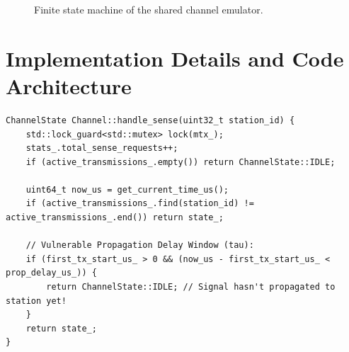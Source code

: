 \documentclass[11pt,a4paper]{article}
\begin{document}
\begin{figure}[H]
\centering
{}
\caption{Finite state machine of the shared channel emulator.}
\label{fig:fsm_diagram}
\end{figure}

\section{Implementation Details and Code Architecture}

\begin{lstlisting}[caption={Propagation modeling and collision arbitration in \texttt{src/channel.cpp}.}]
ChannelState Channel::handle_sense(uint32_t station_id) {
    std::lock_guard<std::mutex> lock(mtx_);
    stats_.total_sense_requests++;
    if (active_transmissions_.empty()) return ChannelState::IDLE;

    uint64_t now_us = get_current_time_us();
    if (active_transmissions_.find(station_id) != active_transmissions_.end()) return state_;

    // Vulnerable Propagation Delay Window (tau):
    if (first_tx_start_us_ > 0 && (now_us - first_tx_start_us_ < prop_delay_us_)) {
        return ChannelState::IDLE; // Signal hasn't propagated to station yet!
    }
    return state_;
}
\end{lstlisting}
\end{document}
